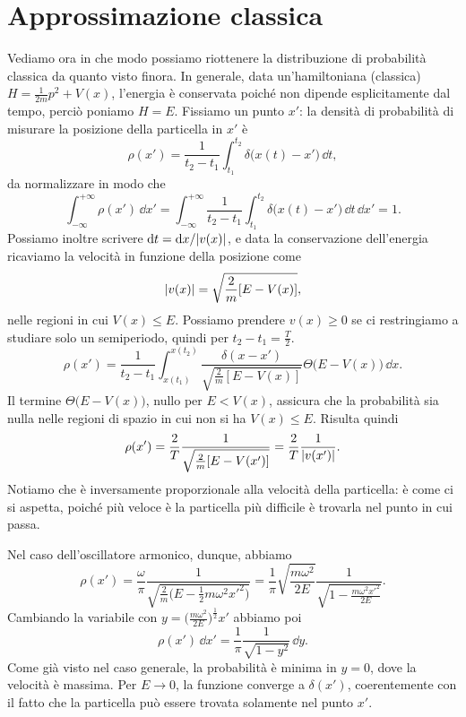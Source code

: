 \section{Approssimazione classica}
Vediamo ora in che modo possiamo riottenere la distribuzione di probabilità classica da quanto visto finora.
In generale, data un'hamiltoniana (classica) $H=\frac1{2m}p^2+V(x)$, l'energia è conservata poich\'e non dipende esplicitamente dal tempo, perciò poniamo $H=E$.
Fissiamo un punto $x'$: la densità di probabilità di misurare la posizione della particella in $x'$ è
\begin{equation}
	\rho(x')=\frac1{t_2-t_1}\int_{t_1}^{t_2}\delta\big(x(t)-x'\big)\,\dd t,
\end{equation}
da normalizzare in modo che
\begin{equation}
	\int_{-\infty}^{+\infty}\rho(x')\,\dd x'=\int_{-\infty}^{+\infty}\frac1{t_2-t_1}\int_{t_1}^{t_2}\delta\big(x(t)-x'\big)\,\dd t\,\dd x'=1.
\end{equation}
Possiamo inoltre scrivere $\textup{d} t=\textup{d} x/\lvert v(x)\rvert$, e data la conservazione dell'energia ricaviamo la velocità in funzione della posizione come
\begin{equation}
	\lvert v(x)\rvert=\sqrt{\frac2{m}[E-V(x)]},
\end{equation}
nelle regioni in cui $V(x)\le E$.
Possiamo prendere $v(x)\ge 0$ se ci restringiamo a studiare solo un semiperiodo, quindi per $t_2-t_1=\frac{T}2$.
\begin{equation}
	\rho(x')=\frac1{t_2-t_1}\int_{x(t_1)}^{x(t_2)}\frac{\delta(x-x')}{\sqrt{\frac2{m}[E-V(x)]}}\Theta\big(E-V(x)\big)\,\dd x.
\end{equation}
Il termine $\Theta\big(E-V(x)\big)$, nullo per $E<V(x)$, assicura che la probabilità sia nulla nelle regioni di spazio in cui non si ha $V(x)\le E$.
Risulta quindi
\begin{equation}
	\rho(x')=\frac2{T}\frac1{\sqrt{\frac2{m}[E-V(x')]}}=\frac2{T}\frac1{\lvert v(x')\rvert}.
\end{equation}
Notiamo che è inversamente proporzionale alla velocità della particella: è come ci si aspetta, poich\'e più veloce è la particella più difficile è trovarla nel punto in cui passa.

Nel caso dell'oscillatore armonico, dunque, abbiamo
\begin{equation}
	\rho(x')=\frac{\omega}{\pi}\frac1{\sqrt{\frac2{m}\big(E-\frac12m\omega^2x'^2\big)}}=\frac1{\pi}\sqrt{\frac{m\omega^2}{2E}}\frac1{\sqrt{1-\frac{m\omega^2x'^2}{2E}}}.
	\label{eq:pdf-classica-oscillatore-armonico}
\end{equation}
Cambiando la variabile con $y=\big(\frac{m\omega^2}{2E}\big)^{\frac12}x'$ abbiamo poi
\begin{equation}
	\rho(x')\,\dd x'=\frac1{\pi}\frac1{\sqrt{1-y^2}}\,\dd y.
\end{equation}
Come già visto nel caso generale, la probabilità è minima in $y=0$, dove la velocità è massima.
Per $E\to 0$, la funzione converge a $\delta(x')$, coerentemente con il fatto che la particella può essere trovata solamente nel punto $x'$.

